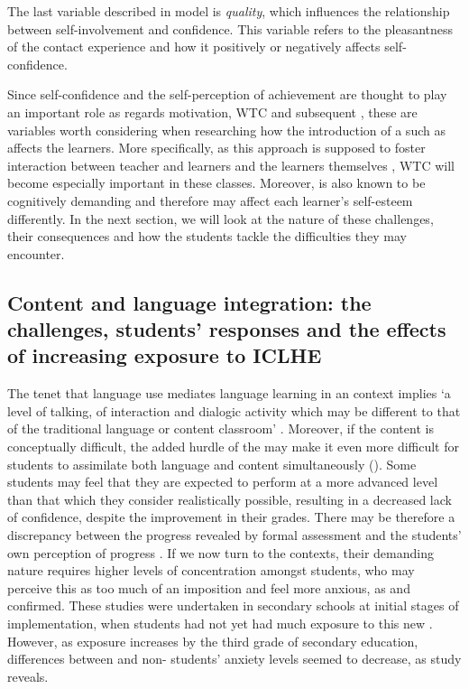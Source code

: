 \documentclass[output=paper]{langsci/langscibook}
\begin{document}
The last variable described in  model is \textit{quality}, which influences the relationship between self-involvement and  confidence. This variable refers to the pleasantness of the contact experience and how it positively or negatively affects self-confidence. 



Since  self-confidence and the self-perception of  achievement are thought to play an important role as regards motivation, WTC and subsequent , these are variables worth considering when researching how the introduction of a  such as  affects the learners. More specifically, as this approach is supposed to foster interaction between teacher and learners and the learners themselves \citep{Coyle2007},  WTC will become especially important in these classes.  Moreover,  is also known to be cognitively demanding \citep{CoyleEtAl2009} and therefore may affect each learner’s self-esteem differently. In the next section, we will look at the nature of these challenges, their consequences and how the students tackle the difficulties they may encounter. 


\subsection{Content and language integration: the challenges, students’ responses and the effects of increasing exposure to ICLHE} 
 

The  tenet that language use mediates language learning   \citep{Swain2000output}  in an  context implies ‘a level of talking, of interaction and dialogic activity which may be different to that of the traditional language or content classroom’ \citep[554]{Coyle2007}. Moreover, if the content is conceptually difficult, the added hurdle of the  may make it even more difficult for students to assimilate both language and content simultaneously (\citealt{Seikkula-Leino2007}). Some students may feel that they are expected to perform at a more advanced level than that which they consider realistically possible, resulting in a decreased lack of confidence, despite the improvement in their grades. There may be therefore a discrepancy between the progress revealed by formal assessment and the students’ own perception of progress \citep{Mearns2012}. If we now turn to the  contexts, their demanding nature requires higher levels of concentration amongst students, who may perceive this as too much of an imposition \citep{Hunt2011} and feel more anxious,  as  \citet{SylvénThompson2015} and \citet{SantosMenezesJuanGarau2013} confirmed.  These studies were undertaken in secondary schools at initial stages of  implementation, when students had not yet had much exposure to this new .  However, as exposure increases by the third grade of secondary education, differences between  and non- students’ anxiety levels seemed to decrease, as  study reveals.
\end{document}
